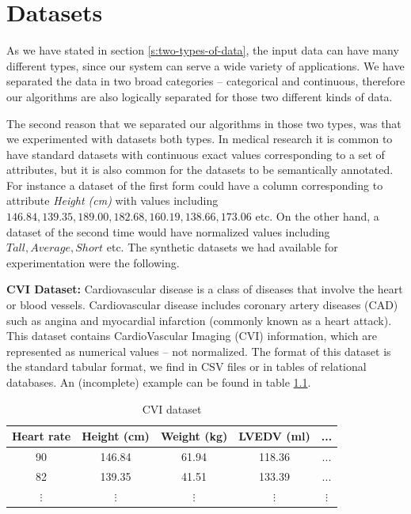 \chapter{Datasets}\label{c:datasets}
As we have stated in section \ref{s:two-types-of-data}, the input data can have many different types, since our system can serve a wide variety of applications.
We have separated the data in two broad categories -- categorical and continuous, therefore our algorithms are also logically separated for those two different kinds of data.

The second reason that we separated our algorithms in those two types, was that we experimented with datasets both types.
In medical research it is common to have standard datasets with continuous exact values corresponding to a set of attributes, but it is also common for the datasets to be semantically annotated.
For instance a dataset of the first form could have a column corresponding to attribute \textit{Height (cm)} with values including $146.84, 139.35, 189.00, 182.68, 160.19, 138.66, 173.06$ etc.
On the other hand, a dataset of the second time would have normalized values including $Tall, Average, Short$ etc.
The synthetic datasets we had available for experimentation were the following.

\textbf{CVI Dataset:}
Cardiovascular disease is a class of diseases that involve the heart or blood vessels.
Cardiovascular disease includes coronary artery diseases (CAD) such as angina and myocardial infarction (commonly known as a heart attack).
This dataset contains CardioVascular Imaging (CVI) information, which are represented as numerical values – not normalized.
The format of this dataset is the standard tabular format, we find in CSV files or in tables of relational databases.
An (incomplete) example can be found in table \ref{t:cvi}.

\begin{table}[H]
  \centering
  \caption{CVI dataset}
  \label{t:cvi}
\begin{center}
  \begin{tabular}{ c | c | c | c | c}
    Heart rate & Height (cm) & Weight (kg) & LVEDV (ml) & ... \\
   \hline
   90 & 146.84 & 61.94 & 118.36 & ... \\
   82 & 139.35 & 41.51 & 133.39 & ... \\
   $\vdots$ & $\vdots$ & $\vdots$ & $\vdots$ & $\vdots$ \\
  \end{tabular}
\end{center}
\end{table}

